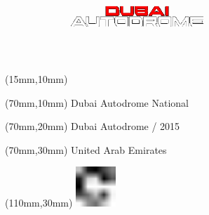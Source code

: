 \null\newpage
\begin{textblock*}{50mm}(15mm,10mm)%
\includegraphics[width=50mm]{LG/DUB.png}
\end{textblock*}
\begin{textblock*}{130mm}(70mm,10mm)%
{\fontsize{20}{20}\selectfont Dubai Autodrome National}\\
\end{textblock*}
\begin{textblock*}{120mm}(70mm,20mm)%
{\fontsize{16}{16}\selectfont Dubai Autodrome / 2015}\\
\end{textblock*}
\begin{textblock*}{120mm}(70mm,30mm)%
{\fontsize{12}{12}\selectfont United Arab Emirates}
\end{textblock*}
\begin{textblock*}{30mm}(110mm,30mm)%
\centering
\includegraphics[height=15mm]{icons/fa-rotate-right.pdf}
\end{textblock*}
